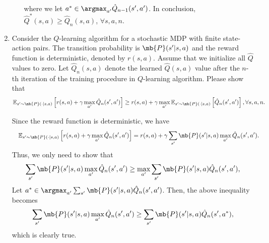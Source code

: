 \begin{exercise}
\begin{enumerate}
\begin{solution}
\begin{enumerate}
\begin{align*}
                        \end{align*}
                        where we let $a^* \in \argmax_{a'} \hat{Q}_{n-1}(s', a')$. In conclusion, $\hat{Q}^*(s,a) \ge \hat{Q}_n(s,a)$, $\forall s,a,n$.
                        \qedhere
                \end{enumerate}
            \end{solution}
        \item
            Consider the $Q$-learning algorithm for a stochastic MDP with finite state-action pairs. The transition probability is $\mb{P}(s'|s,a)$ and the reward function is deterministic, denoted by $r(s,a)$. Assume that we initialize all $\hat{Q}$ values to zero. Let $\hat{Q}_n(s,a)$ denote the learned $\hat{Q}(s,a)$  value after the $n$-th iteration of the training procedure in $Q$-learning algorithm.
            Please show that
            $$
                \mathbb{E}_{s'\sim \mb{P}(\cdot|s,a)}\left[r(s,a)+\gamma \max_{a'} \hat{Q}_{n}(s',a')\right] \geq r(s,a)+\gamma  \max_{a'}\mathbb{E}_{s'\sim \mb{P}(\cdot|s,a)}\left[\hat{Q}_{n}(s',a')\right] ,\forall s,a,n.
            $$
            \begin{solution}
                Since the reward function is deterministic, we have
                \begin{align*}
                     & \quad \mathbb{E}_{s'\sim \mb{P}(\cdot|s,a)}\left[r(s,a)+\gamma \max_{a'} \hat{Q}_{n}(s',a')\right] = r(s,a) + \gamma \sum_{s'} \mb{P}(s'|s,a) \max_{a'} \hat{Q}_{n}(s',a').
                \end{align*}
                Thus, we only need to show that
                \begin{align*}
                    \sum_{s'} \mb{P}(s'|s,a) \max_{a'} \hat{Q}_{n}(s',a') \ge \max_{a'} \sum_{s'} \mb{P}(s'|s,a) \hat{Q}_{n}(s',a'),
                \end{align*}
                Let $a^* \in \argmax_{a'} \sum_{s'} \mb{P}(s'|s,a) \hat{Q}_{n}(s',a')$. Then, the above inequality becomes
                \begin{align*}
                    \sum_{s'} \mb{P}(s'|s,a) \max_{a'} \hat{Q}_{n}(s',a') \ge \sum_{s'} \mb{P}(s'|s,a) \hat{Q}_{n}(s',a^*),
                \end{align*}
                which is clearly true.
                \qedhere
            \end{solution}
    \end{enumerate}
\end{exercise}
\clearpage




% 
%



